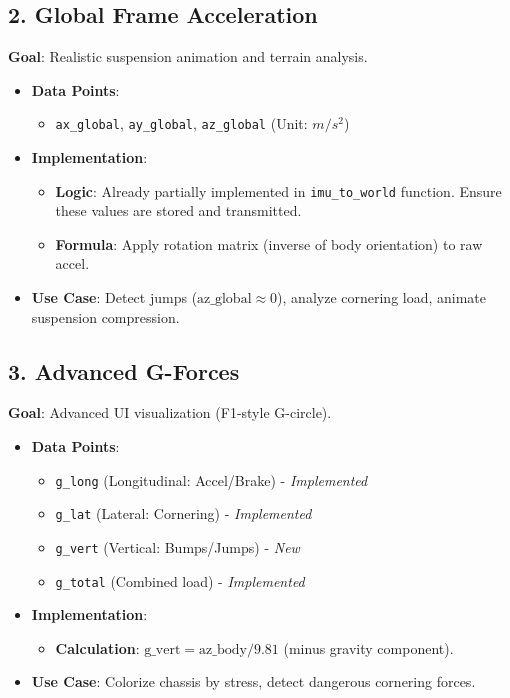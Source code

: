 \documentclass[11pt,a4paper]{article}
\begin{document}
\subsection{2. Global Frame Acceleration}
\textbf{Goal}: Realistic suspension animation and terrain analysis.
\begin{itemize}
    \item \textbf{Data Points}:
    \begin{itemize}
        \item \texttt{ax\_global}, \texttt{ay\_global}, \texttt{az\_global} (Unit: $m/s^2$)
    \end{itemize}
    \item \textbf{Implementation}:
    \begin{itemize}
        \item \textbf{Logic}: Already partially implemented in \texttt{imu\_to\_world} function. Ensure these values are stored and transmitted.
        \item \textbf{Formula}: Apply rotation matrix (inverse of body orientation) to raw accel.
    \end{itemize}
    \item \textbf{Use Case}: Detect jumps ($\text{az\_global} \approx 0$), analyze cornering load, animate suspension compression.
\end{itemize}

\subsection{3. Advanced G-Forces}
\textbf{Goal}: Advanced UI visualization (F1-style G-circle).
\begin{itemize}
    \item \textbf{Data Points}:
    \begin{itemize}
        \item \texttt{g\_long} (Longitudinal: Accel/Brake) - \textit{Implemented}
        \item \texttt{g\_lat} (Lateral: Cornering) - \textit{Implemented}
        \item \texttt{g\_vert} (Vertical: Bumps/Jumps) - \textit{New}
        \item \texttt{g\_total} (Combined load) - \textit{Implemented}
    \end{itemize}
    \item \textbf{Implementation}:
    \begin{itemize}
        \item \textbf{Calculation}: $\text{g\_vert} = \text{az\_body} / 9.81$ (minus gravity component).
    \end{itemize}
    \item \textbf{Use Case}: Colorize chassis by stress, detect dangerous cornering forces.
\end{itemize}
\end{document}
